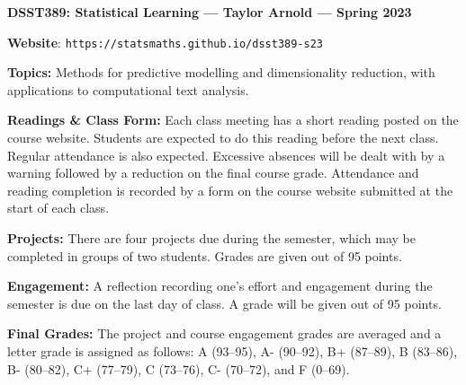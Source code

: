 \documentclass[11pt, a4paper]{article}
\begin{document}
\begin{center}
\textbf{DSST389: Statistical Learning --- Taylor Arnold --- Spring 2023}
\end{center}

\vspace{0.5cm}

\textbf{Website}: \texttt{https://statsmaths.github.io/dsst389-s23}

\bigskip

\textbf{Topics:}
Methods for predictive modelling and dimensionality reduction, with
applications to computational text analysis.

\bigskip

\textbf{Readings \& Class Form:}
Each class meeting has a short reading posted on the course website.
Students are expected to do this reading before the next class.
Regular attendance is also expected. Excessive absences will be dealt
with by a warning followed by a reduction on the final course grade.
Attendance and reading completion is recorded by a form on the course
website submitted at the start of each class.

\bigskip

\textbf{Projects:}
There are four projects due during the semester, which may be completed in
groups of two students. Grades are given out of 95 points.

\bigskip

\textbf{Engagement:}
A reflection recording one's effort and engagement during the semester
is due on the last day of class. A grade will be given out of 95 points.

\bigskip

\textbf{Final Grades:}
The project and course engagement grades are averaged and a letter grade
is assigned as follows:
             A (93--95), A- (90--92),
B+ (87--89), B (83--86), B- (80--82),
C+ (77--79), C (73--76), C- (70--72), and F (0--69).
\end{document}
